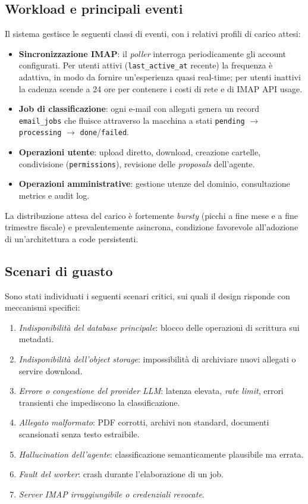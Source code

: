 \documentclass[11pt,a4paper,oneside]{article}
\begin{document}
\subsection{Workload e principali eventi}
Il sistema gestisce le seguenti classi di eventi, con i relativi profili di carico
attesi:
\begin{itemize}[leftmargin=*]
    \item \textbf{Sincronizzazione IMAP}: il \emph{poller} interroga periodicamente
          gli account configurati. Per utenti attivi (\texttt{last\_active\_at}
          recente) la frequenza \`e adattiva, in modo da fornire un'esperienza
          quasi real-time; per utenti inattivi la cadenza scende a 24 ore per
          contenere i costi di rete e di IMAP \textsc{API} usage.
    \item \textbf{Job di classificazione}: ogni e-mail con allegati genera un
          record \texttt{email\_jobs} che fluisce attraverso la macchina a stati
          \texttt{pending} $\rightarrow$ \texttt{processing} $\rightarrow$
          \texttt{done}/\texttt{failed}.
    \item \textbf{Operazioni utente}: upload diretto, download, creazione
          cartelle, condivisione (\texttt{permissions}), revisione delle
          \emph{proposals} dell'agente.
    \item \textbf{Operazioni amministrative}: gestione utenze del dominio,
          consultazione metrics e audit log.
\end{itemize}
La distribuzione attesa del carico \`e fortemente \emph{bursty} (picchi a fine
mese e a fine trimestre fiscale) e prevalentemente asincrona, condizione
favorevole all'adozione di un'architettura a code persistenti.

\subsection{Scenari di guasto}
\label{sec:failure-scenarios}
Sono stati individuati i seguenti scenari critici, sui quali il design risponde
con meccanismi specifici:
\begin{enumerate}[leftmargin=*]
    \item \emph{Indisponibilit\`a del database principale}: blocco delle
          operazioni di scrittura sui metadati.
    \item \emph{Indisponibilit\`a dell'object storage}: impossibilit\`a di
          archiviare nuovi allegati o servire download.
    \item \emph{Errore o congestione del provider LLM}: latenza elevata,
          \emph{rate limit}, errori transienti che impediscono la classificazione.
    \item \emph{Allegato malformato}: PDF corrotti, archivi non standard,
          documenti scansionati senza testo estraibile.
    \item \emph{Hallucination dell'agente}: classificazione semanticamente
          plausibile ma errata.
    \item \emph{Fault del worker}: crash durante l'elaborazione di un job.
    \item \emph{Server IMAP irraggiungibile o credenziali revocate}.
\end{enumerate}
\end{document}

